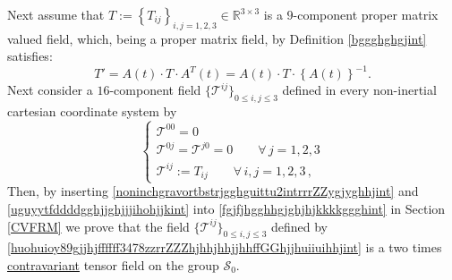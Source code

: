 \documentclass{article}
\theoremstyle{definition}
\theoremstyle{remark}
\newcommand{\R}{\mathbb{R}}
\newcommand{\er}{\eqref}
\newcommand{\R}{{\mathbb{R}}}
\newcommand{\er}{\eqref}
\begin{document}
Next assume that $T:=\left\{T_{ij}\right\}_{i,j=1,2,3}\in
\R^{3\times 3}$ is a $9$-component proper matrix valued field,
which, being a proper matrix field, by Definition \ref{bggghghgjint}
satisfies:
\begin{equation}\label{uguyytfddddgghjjghjjjihohjjkint}
T'=A(t)\cdot T\cdot A^T(t)=A(t)\cdot T\cdot
\left\{A(t)\right\}^{-1}.
\end{equation}
Next consider a $16$-component field $\{\mathcal{T}^{ij}\}_{0\leq
i,j\leq 3}$ defined in every non-inertial cartesian coordinate
system by
\begin{equation}\label{huohuioy89gjjhjffffff3478zzrrZZZhjhhjhhjjhhffGGhjjhuiiuihhjint}
\begin{cases}
\mathcal{T}^{00}=0
\\
\mathcal{T}^{0j}=\mathcal{T}^{j0}=0\quad\quad\forall\, j=1,2,3
\\
\mathcal{T}^{ij}:=T_{ij}\quad\quad\forall\, i,j=1,2,3\,,
\end{cases}
\end{equation}
Then, by inserting
\er{noninchgravortbstrjgghguittu2intrrrZZygjyghhjint} and
\er{uguyytfddddgghjjghjjjihohjjkint} into
\er{fgjfjhgghhgjghjhjkkkkggghint} in Section \ref{CVFRM} we  prove
that the field $\{\mathcal{T}^{ij}\}_{0\leq i,j\leq 3}$ defined by
\er{huohuioy89gjjhjffffff3478zzrrZZZhjhhjhhjjhhffGGhjjhuiiuihhjint}
is a two times \underline{contravariant} tensor field on the group
$\mathcal{S}_0$.
%
%
%
\end{document}
